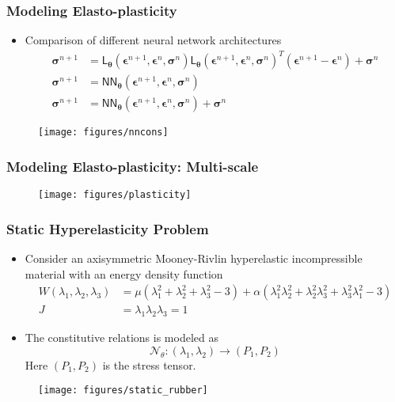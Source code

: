 \documentclass[usenames,dvipsnames]{beamer}
\newcommand{\ChoL}{\mathsf{L}}
\newcommand{\bt}[0]{\bm{\theta}}
\begin{document}
\begin{frame}
	\frametitle{Modeling Elasto-plasticity}
	\begin{itemize}
		\item Comparison of different neural network architectures 
		\begin{align*}
			\bm\sigma^{n+1} &= \ChoL_{\bt}(\bm\epsilon^{n+1},\bm{\epsilon}^{n},\bm{\sigma}^{n}) \ChoL_{\bt}(\bm\epsilon^{n+1},\bm{\epsilon}^{n},\bm{\sigma}^{n})^T (\bm{\epsilon}^{n+1} - \bm{\epsilon}^{n})  + \bm{\sigma}^{n} \\
			\bm{\sigma}^{n+1} &=  \mathsf{NN}_{\bt}(\bm\epsilon^{n+1},\bm{\epsilon}^{n},\bm{\sigma}^{n})\\
			\bm{\sigma}^{n+1} &=  \mathsf{NN}_{\bt}(\bm\epsilon^{n+1},\bm{\epsilon}^{n},\bm{\sigma}^{n}) + \bm{\sigma}^{n}
		\end{align*}
	\end{itemize}
	\begin{figure}[hbt]
		\texttt{[image: figures/nncons]}
	\end{figure}
\end{frame}

\begin{frame}
	\frametitle{Modeling Elasto-plasticity: Multi-scale}
	\begin{figure}[hbt]
		\texttt{[image: figures/plasticity]}
	\end{figure}
\end{frame}


\begin{frame}
	\frametitle{Static Hyperelasticity Problem}
	
	\begin{itemize}
		\item Consider an axisymmetric Mooney-Rivlin hyperelastic incompressible material with an energy density function 
		\begin{align*}
			W(\lambda_1, \lambda_2, \lambda_3) &= \mu(\lambda_1^2+\lambda_2^2+\lambda_3^2-3) + \alpha (\lambda_1^2\lambda_2^2 + \lambda_2^2\lambda_3^2+\lambda_3^2\lambda_1^2 - 3)\\
			J &= \lambda_1\lambda_2\lambda_3 = 1 
		\end{align*}
		
		\item The constitutive relations is modeled as 
		$$\mathcal{N}_\theta: (\lambda_1, \lambda_2) \rightarrow (P_1, P_2)$$
		Here $(P_1, P_2)$ is the stress tensor. 
		
	\end{itemize}
	\begin{figure}[hbt]
		\texttt{[image: figures/static\_rubber]}
	\end{figure}
\end{frame}
\end{document}
